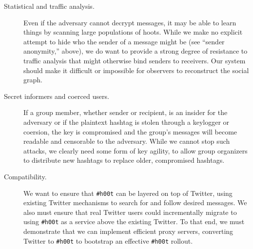 \documentclass{sig-alternate-arxiv}
\newcommand{\hlfixme}[1]{\fixme{\hl{#1}}}
\newcommand{\hoot}{{\tt \#h00t}\xspace}
\newcommand{\msgs}{hoots\xspace}
\begin{document}
\begin{description}
\item[Statistical and traffic analysis.] Even if the adversary cannot
  decrypt messages, it may be able to learn things by scanning large
  populations of \msgs. While we make no explicit attempt to hide who
  the sender of a message might be (see ``sender anonymity,'' above), we
  do want to provide a strong degree of resistance to traffic analysis
  that might otherwise bind senders to receivers. Our system should make
  it difficult or impossible for observers to reconstruct the social
  graph.

\item[Secret informers and coerced users.] If a group member, whether
  sender or recipient, is an insider for the adversary or if the
  plaintext hashtag is stolen through a keylogger or coersion, the key
  is compromised and the group's messages will become readable and
  censorable to the adversary. While we cannot stop such attacks, we
  clearly need some form of key agility, to allow group organizers to
  distribute new hashtags to replace older, compromised hashtags.

\item[Compatibility.] We want to ensure that \hoot can be layered on top
  of Twitter, using existing Twitter mechanisms to search for and follow
  desired messages. We also must ensure that real Twitter users could
  incrementally migrate to using \hoot  as a service above the existing
  Twitter. To that end, we must demonstrate that we can implement
  efficient proxy servers, converting Twitter to \hoot to bootstrap an
  effective \hoot rollout.

\end{description}
\end{document}
